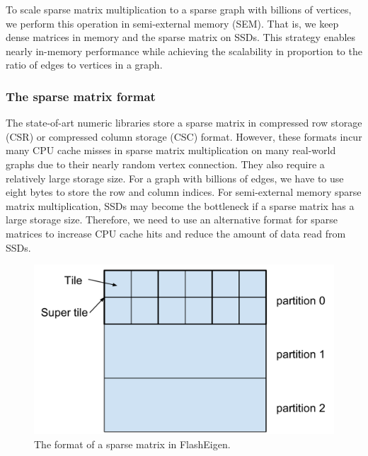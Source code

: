 To scale sparse matrix multiplication to a sparse graph with billions of vertices,
we perform this operation in semi-external memory (SEM). That is, we keep dense
matrices in memory and the sparse
matrix on SSDs. This strategy enables nearly in-memory performance while achieving
the scalability in proportion to the ratio of edges to vertices in a graph.

\subsubsection{The sparse matrix format}
The state-of-art numeric libraries store a sparse matrix in compressed row storage
(CSR) or compressed column storage (CSC) format. However, these formats incur
many CPU cache misses in sparse matrix multiplication on many real-world graphs
due to their nearly random vertex connection. They also require a relatively
large storage size. For a graph with billions of edges, we have to use eight
bytes to store the row and column indices. For semi-external memory sparse
matrix multiplication, SSDs may become the bottleneck if a sparse matrix has
a large storage size.
Therefore, we need to use an alternative format for sparse matrices to increase
CPU cache hits and reduce the amount of data read from SSDs.

\begin{figure}
\centering
\includegraphics[scale=0.3]{./sparse_mat.pdf}
\vspace{-5pt}
\caption{The format of a sparse matrix in FlashEigen.}
\vspace{-5pt}
\label{sparse_mat}
\end{figure}


